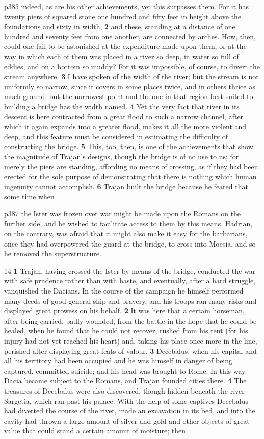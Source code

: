 p385 indeed, as are his other achievements, yet this surpasses them. For it has twenty piers of squared stone one hundred and fifty feet in height above the foundations and sixty in width, \textbf{2} and these, standing at a distance of one hundred and seventy feet from one another, are connected by arches. How, then, could one fail to be astonished at the expenditure made upon them, or at the way in which each of them was placed in a river so deep, in water so full of eddies, and on a bottom so muddy? For it was impossible, of course, to divert the stream anywhere. \textbf{3} I have spoken of the width of the river; but the stream is not uniformly so narrow, since it covers in some places twice, and in others thrice as much ground, but the narrowest point and the one in that region best suited to building a bridge has the width named. \textbf{4} Yet the very fact that river in its descent is here contracted from a great flood to such a narrow channel, after which it again expands into a greater flood, makes it all the more violent and deep, and this feature must be considered in estimating the difficulty of constructing the bridge. \textbf{5} This, too, then, is one of the achievements that show the magnitude of Trajan's designs, though the bridge is of no use to us; for merely the piers are standing, affording no means of crossing, as if they had been erected for the sole purpose of demonstrating that there is nothing which human ingenuity cannot accomplish. \textbf{6} Trajan built the bridge because he feared that some time when

p387 the Ister was frozen over war might be made upon the Romans on the further side, and he wished to facilitate access to them by this means. Hadrian, on the contrary, was afraid that it might also make it easy for the barbarians, once they had over­powered the guard at the bridge, to cross into Moesia, and so he removed the superstructure.

14
\textbf{1} Trajan, having crossed the Ister by means of the bridge, conducted the war with safe prudence rather than with haste, and eventually, after a hard struggle, vanquished the Dacians. In the course of the campaign he himself performed many deeds of good general ­ship and bravery, and his troops ran many risks and displayed great prowess on his behalf. \textbf{2} It was here that a certain horseman, after being carried, badly wounded, from the battle in the hope that he could be healed, when he found that he could not recover, rushed from his tent (for his injury had not yet reached his heart) and, taking his place once more in the line, perished after displaying great feats of valour. \textbf{3} Decebalus, when his capital and all his territory had been occupied and he was himself in danger of being captured, committed suicide; and his head was brought to Rome. In this way Dacia became subject to the Romans, and Trajan founded cities there. \textbf{4} The treasures of Decebalus were also discovered, though hidden beneath the river Sargetia, which ran past his palace. With the help of some captives Decebalus had diverted the course of the river, made an excavation in its bed, and into the cavity had thrown a large amount of silver and gold and other objects of great value that could stand a certain amount of moisture; then

